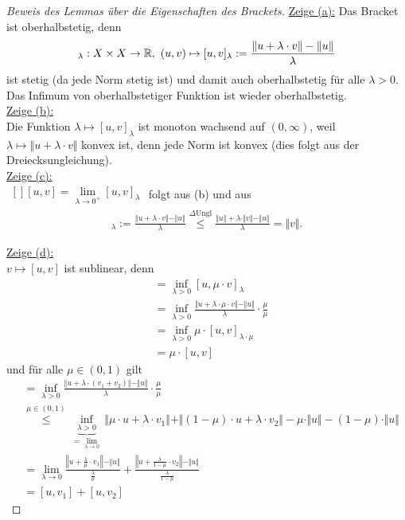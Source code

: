 \begin{proof}[Beweis des Lemmas über die Eigenschaften des Brackets]\enter
\underline{Zeige (a):} Das Bracket ist oberhalbstetig, denn
\begin{align*}
[\cdot,\cdot]_\lambda:X\times X\to\R,~(u,v)\mapsto[u,v]_\lambda:=\frac{\Vert u+\lambda\cdot v\Vert - \Vert u\Vert}{\lambda}
\end{align*}
ist stetig (da jede Norm stetig ist) und damit auch oberhalbstetig für alle $\lambda>0$. Das Infimum von oberhalbstetiger Funktion ist wieder oberhalbstetig.\\

\underline{Zeige (b):}\\
Die Funktion $\lambda\mapsto[u,v]_\lambda$ ist monoton wachsend auf $(0,\infty)$, weil $\lambda\mapsto\Vert u+\lambda\cdot v\Vert$ konvex ist, denn jede Norm ist konvex (dies folgt aus der Dreiecksungleichung).\\

\underline{Zeige (c):}\\
$\begin{aligned}[]
[u,v]=\lim\limits_{\lambda\to0^+}[u,v]_\lambda
\end{aligned}$ folgt aus (b) und aus
\begin{align*}
[u,v]_\lambda:=\frac{\Vert u+\lambda\cdot v\Vert-\Vert u\Vert}{\lambda}
\stackrel{\Delta\text{Ungl}}{\leq}
\frac{\Vert u\Vert+\lambda\cdot\Vert v\Vert-\Vert u\Vert}{\lambda}
=\Vert v\Vert.
\end{align*}

\underline{Zeige (d):}\\
$v\mapsto[u,v]$ ist sublinear, denn
\begin{align*}
[u,\mu\cdot v]
&=
\inf\limits_{\lambda>0}[u,\mu\cdot v]_\lambda\\
&=\inf\limits_{\lambda>0}\frac{\Vert u+\lambda\cdot\mu\cdot v\Vert-\Vert u\Vert}{\lambda}\cdot\frac{\mu}{\mu}\\
&=\inf\limits_{\lambda>0}\mu\cdot[u,v]_{\lambda\cdot\mu}\\
&=\mu\cdot[u,v]
\end{align*}
und für alle $\mu\in(0,1)$ gilt
\begin{align*}
[u,v_1+v_2]
&=
\inf\limits_{\lambda>0}\frac{\Vert u+\lambda\cdot(v_1+v_2)\Vert-\Vert u\Vert}{\lambda}\cdot\frac{\mu}{\mu}\\
&\stackrel{\mu\in(0,1)}{\leq}
\underbrace{\inf\limits_{\lambda>0}}_{=\lim\limits_{\lambda\to0}}\Vert\mu\cdot u+\lambda\cdot v_1\Vert+\Vert(1-\mu)\cdot u+\lambda\cdot v_2\Vert-\mu\cdot\Vert u\Vert-(1-\mu)\cdot\Vert u\Vert\\
&=\lim\limits_{\lambda\to0}\frac{\left\Vert u+\frac{\lambda}{\mu}\cdot v_1\right\Vert-\Vert u\Vert}{\frac{\lambda}{\mu}}+\frac{\left\Vert u+\frac{\lambda}{1-\mu}\cdot v_2\right\Vert-\Vert u\Vert}{\frac{\lambda}{1-\mu}}\\
&=[u,v_1]+[u,v_2]
\end{align*}


\end{proof}
